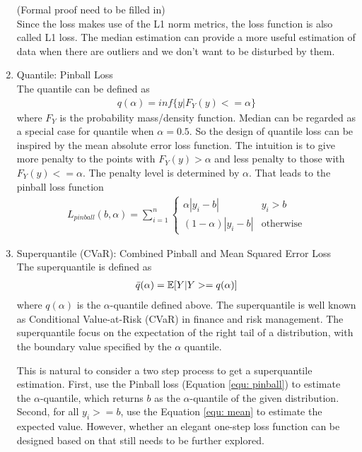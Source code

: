 \documentclass[11pt]{article}
\begin{document}
\begin{enumerate}
    (Formal proof need to be filled in)\\
    Since the loss makes use of the L1 norm metrics, the loss function is also called L1 loss. 
    The median estimation can provide a more useful estimation of data when there are outliers and we don't want to be disturbed by them.
    \item Quantile: Pinball Loss\\
    The quantile can be defined as 
    \begin{align}
        q(\alpha) = inf \{y| F_Y (y) <= \alpha \}
    \end{align}
    where $F_Y$ is the probability mass/density function. Median can be regarded as a special case for quantile when $\alpha = 0.5$. So the design of quantile loss can be inspired by the mean absolute error loss function. The intuition is to give more penalty to the points with $F_Y(y) > \alpha$ and less penalty to those with $F_Y(y) <= \alpha$. The penalty level is determined by $\alpha$. That leads to the pinball loss function
    \begin{align}
        \label{equ: pinball}
        L_{pinball}(b, \alpha) = \sum_{i= 1}^n \begin{cases}
            \alpha |y_i - b| & y_i > b\\
            (1-\alpha) |y_i - b| & \text{otherwise}
            \end{cases}
    \end{align}
    
    \item Superquantile (CVaR): Combined Pinball and Mean Squared Error Loss\\
    The superquantile is defined as 
    \begin{align}
        \Bar{q}(\alpha) = \mathbb{E}[Y|Y >= q(\alpha)]
    \end{align}
    where $q(\alpha)$ is the $\alpha$-quantile defined above. The superquantile is well known as Conditional Value-at-Risk (CVaR) in finance and risk management. The superquantile focus on the expectation of the right tail of a distribution, with the boundary value specified by the $\alpha$ quantile. 
    
    This is natural to consider a two step process to get a superquantile estimation. First, use the Pinball loss (Equation \ref{equ: pinball}) to estimate the $\alpha$-quantile, which returns $b$ as the $\alpha$-quantile of the given distribution. Second, for all $y_i >= b$, use the Equation \ref{equ: mean} to estimate the expected value. However, whether an elegant one-step loss function can be designed based on that still needs to be further explored.
    
    
\end{enumerate}
\end{document}
